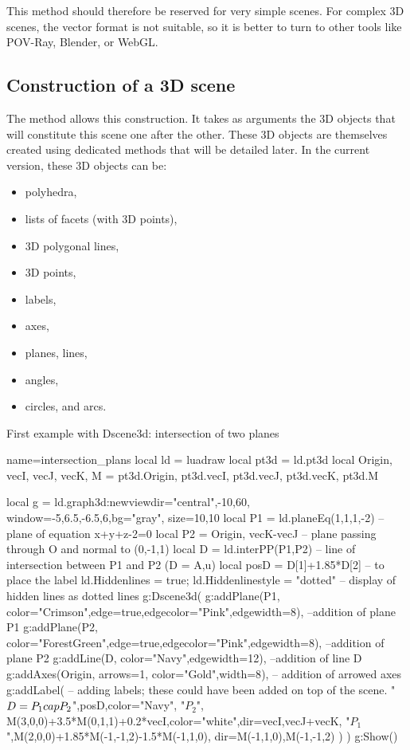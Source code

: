 This method should therefore be reserved for very simple scenes. For complex 3D scenes, the vector format is not suitable, so it is better to turn to other tools like POV-Ray, Blender, or WebGL.


\subsection{Construction of a 3D scene}

The  method allows this construction. It takes as arguments the 3D objects that will constitute this scene one after the other. These 3D objects are themselves created using dedicated methods that will be detailed later. In the current version, these 3D objects can be:
\begin{itemize}
    \item polyhedra,
    \item lists of facets (with 3D points),
    \item 3D polygonal lines,
    \item 3D points,
    \item labels,
    \item axes,
    \item planes, lines,
    \item angles,
    \item circles, and arcs.
\end{itemize}

\begin{demo}[planes]{First example with Dscene3d: intersection of two planes}
\begin{luadraw}{name=intersection_plans}
local ld = luadraw
local pt3d = ld.pt3d
local Origin, vecI, vecJ, vecK, M = pt3d.Origin, pt3d.vecI, pt3d.vecJ, pt3d.vecK, pt3d.M

local g = ld.graph3d:new{viewdir={"central",-10,60}, window={-5,6.5,-6.5,6},bg="gray", size={10,10}}
local P1 = ld.planeEq(1,1,1,-2) -- plane of equation x+y+z-2=0
local P2 = {Origin, vecK-vecJ} -- plane passing through O and normal to (0,-1,1)
local D = ld.interPP(P1,P2) -- line of intersection between P1 and P2 (D = {A,u})
local posD = D[1]+1.85*D[2] -- to place the label
ld.Hiddenlines = true; ld.Hiddenlinestyle = "dotted" -- display of hidden lines as dotted lines
g:Dscene3d(
    g:addPlane(P1, {color="Crimson",edge=true,edgecolor="Pink",edgewidth=8}), --addition of plane P1
    g:addPlane(P2, {color="ForestGreen",edge=true,edgecolor="Pink",edgewidth=8}), --addition of plane P2
    g:addLine(D, {color="Navy",edgewidth=12}), --addition of line D
    g:addAxes(Origin, {arrows=1, color="Gold",width=8}), -- addition of arrowed axes
    g:addLabel( -- adding labels; these could have been added on top of the scene.
        "$D=P_1\\cap P_2$",posD,{color="Navy"},
        "$P_2$", M(3,0,0)+3.5*M(0,1,1)+0.2*vecI,{color="white",dir={vecI,vecJ+vecK}},
        "$P_1$",M(2,0,0)+1.85*M(-1,-1,2)-1.5*M(-1,1,0), {dir={M(-1,1,0),M(-1,-1,2)}} )
)
g:Show()
\end{luadraw}
\end{demo}

